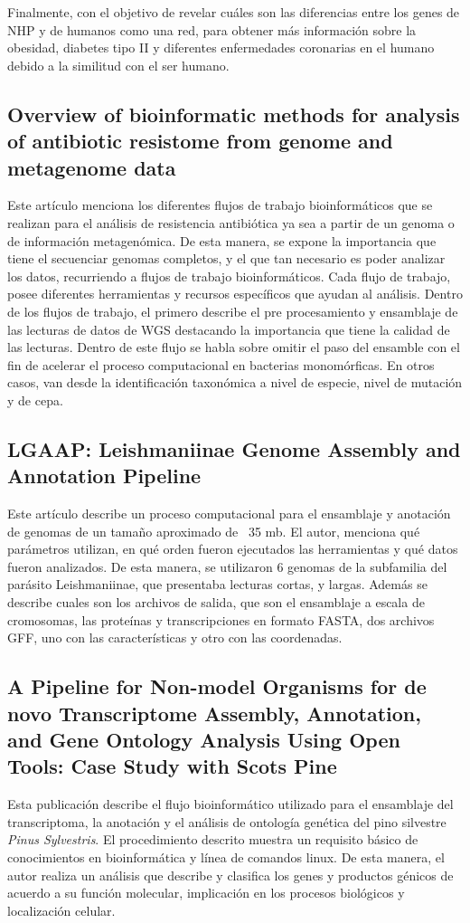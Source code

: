 \documentclass[12pt]{article}
\begin{document}
Finalmente, con el objetivo de revelar cuáles son las diferencias entre los genes de 
NHP y de humanos como una red, para obtener más información sobre la obesidad, 
diabetes tipo II y diferentes enfermedades coronarias en el humano debido a la similitud 
con el ser humano.

\subsection*{Overview of bioinformatic methods for analysis of antibiotic resistome from genome and metagenome data}
Este artículo menciona los diferentes flujos de trabajo bioinformáticos que se realizan 
para el análisis de resistencia antibiótica ya sea a partir de un genoma o de información 
metagenómica.  De esta manera, se expone la importancia que tiene el secuenciar genomas 
completos, y el que tan necesario es poder analizar los datos, recurriendo a flujos de 
trabajo bioinformáticos. Cada flujo de trabajo, posee diferentes herramientas y recursos 
específicos que ayudan al análisis. Dentro de los flujos de trabajo, el primero describe el 
pre procesamiento y ensamblaje de las lecturas de datos de WGS destacando la importancia 
que tiene la calidad de las lecturas. Dentro de este flujo se habla sobre omitir el 
paso del ensamble con el fin de acelerar el proceso computacional en bacterias monomórficas. 
En otros casos, van desde la identificación taxonómica a nivel de especie, nivel de mutación 
y de cepa.

\subsection*{LGAAP: Leishmaniinae Genome Assembly and Annotation Pipeline}
Este artículo describe un proceso computacional para el ensamblaje y anotación de 
genomas de un tamaño aproximado de ~35 mb. El autor, menciona qué parámetros utilizan, 
en qué orden fueron ejecutados las herramientas y qué datos fueron analizados.  
De esta manera, se utilizaron 6 genomas de la subfamilia del parásito Leishmaniinae, 
que presentaba lecturas cortas, y largas. Además se describe cuales son los archivos
de salida, que son el ensamblaje a escala de cromosomas, las proteínas y transcripciones 
en formato FASTA, dos archivos GFF, uno con las características y otro con las coordenadas.

\subsection*{A Pipeline for Non-model Organisms for de novo Transcriptome Assembly, Annotation, and Gene Ontology Analysis Using Open Tools: Case Study with Scots Pine }
Esta publicación describe el flujo bioinformático utilizado para el ensamblaje del 
transcriptoma, la anotación y el análisis de ontología genética del pino silvestre 
\emph{Pinus Sylvestris}. El procedimiento descrito muestra un requisito básico de 
conocimientos en bioinformática  y línea de comandos linux. De esta manera, el autor 
realiza un análisis que describe y clasifica los genes y productos génicos de acuerdo a 
su función molecular, implicación en los procesos biológicos y localización celular.
\end{document}
